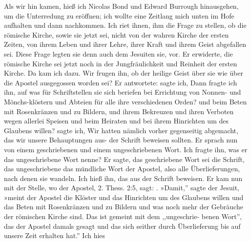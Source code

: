Als wir hin kamen, hieß ich Nicolas Bond 
und Edward Burrough
hinausgehen, um die Unterredung zu eröffnen; ich wollte eine
Zeitlang mich unten im Hofe aufhalten und dann nachkommen.
Ich riet ihnen, ihm die Frage zu stellen, ob die römische Kirche,
sowie sie jetzt sei, nicht von der wahren Kirche der ersten Zeiten,
von ihrem Leben und ihrer Lehre, ihrer Kraft und ihrem Geist
abgefallen sei. Diese Frage legten sie denn auch dem Jesuiten sie,
vor. Er erwiderte, die römische Kirche sei jetzt noch in der 
Jungfräulichkeit und Reinheit der ersten Kirche. Da kam ich dazu.
Wir frugen ihn, ob der heilige Geist über sie wie über die Apostel
ausgegossen worden sei? Er antwortete:   sagte
ich,  Dann fragte ich ihn, auf was
für Schriftstellen sie sich beriefen bei Errichtung von Nonnen- und
Mönchs-klöstern und Abteien für alle ihre verschiedenen Orden?
und beim Beten mit Rosenkränzen und zu Bildern, und ihrem
Bekreuzen und ihren Verboten wegen allerlei Speisen und beim
Heiraten und bei ihrem Hinrichten um des Glaubens willen?
 sagte ich,  Wir hatten nämlich
vorher gegenseitig abgemacht, das wir unsere Behauptungen aus-
der Schrift beweisen sollten. Er sprach nun 
von einem geschriebenen und einem ungeschriebenen Wort. Ich 
fragte ihn, was er
das ungeschriebene Wort nenne? Er sagte, das geschriebene
Wort sei die Schrift, das ungeschriebene das mündliche Wort der
Apostel, also alle Überlieferungen, nach denen sie wandeln. 
 Ich
hieß ihn, das aus der Schrift beweisen. Er kam nun mit der
Stelle, wo der Apostel, 2. Thess. 2:5,
 sagt: .
»Damit,'' sagte der Jesuit, »meint der Apostel die Klöster und
das Hinrichten um des Glaubens willen und das Beten mit
Rosenkränzen und zu Bildern und was noch mehr der Gebräuche
der römischen Kirche sind. Das ist gemeint mit dem ,,ungeschrie-
benen Wort'', das der Apostel damals gesagt und das sich seither
durch Überlieferung bis auf unsere Zeit erhalten hat.'' Ich hies
